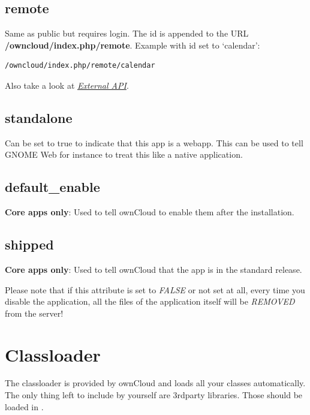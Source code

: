 \documentclass[letterpaper,10pt,english]{sphinxmanual}
\begin{document}
\subsection{remote}
\label{app/info:remote}
Same as public but requires login. The id is appended to the URL \textbf{/owncloud/index.php/remote}. Example with id set to `calendar':

\begin{Verbatim}[commandchars=\\\{\}]
/owncloud/index.php/remote/calendar
\end{Verbatim}

Also take a look at {\hyperref[core/externalapi::doc]{\emph{External API}}}.


\subsection{standalone}
\label{app/info:standalone}
Can be set to true to indicate that this app is a webapp. This can be used to tell GNOME Web for instance to treat this like a native application.


\subsection{default\_enable}
\label{app/info:default-enable}
\textbf{Core apps only}: Used to tell ownCloud to enable them after the installation.


\subsection{shipped}
\label{app/info:shipped}
\textbf{Core apps only}: Used to tell ownCloud that the app is in the standard release.

Please note that if this attribute is set to \emph{FALSE} or not set at all, every time you disable the application, all the files of the application itself will be \emph{REMOVED} from the server!


\section{Classloader}
\label{app/classloader:classloader}\label{app/classloader::doc}
The classloader is provided by ownCloud and loads all your classes automatically. The only thing left to include by yourself are 3rdparty libraries. Those should be loaded in .

\end{document}
